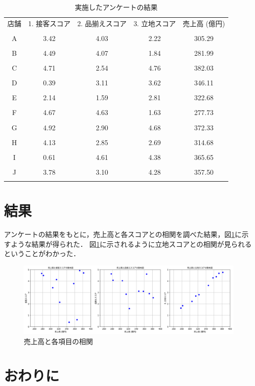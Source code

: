 \documentclass[uplatex]{jsarticle}
\begin{document}
\begin{table}[H]
    \centering
    \caption{実施したアンケートの結果}
    \label{table:anket_result}
    \begin{tabular}{ccccc}
        \hline
        店舗 & 1. 接客スコア & 2. 品揃えスコア & 3. 立地スコア & 売上高 (億円) \\\\ \hline
        A & 3.42 & 4.03 & 2.22 & 305.29 \\\\ \hline
        B & 4.49 & 4.07 & 1.84 & 281.99 \\\\ \hline
        C & 4.71 & 2.54 & 4.76 & 382.03 \\\\ \hline
        D & 0.39 & 3.11 & 3.62 & 346.11 \\\\ \hline
        E & 2.14 & 1.59 & 2.81 & 322.68 \\\\ \hline
        F & 4.67 & 4.63 & 1.63 & 277.73 \\\\ \hline
        G & 4.92 & 2.90 & 4.68 & 372.33 \\\\ \hline
        H & 4.13 & 2.85 & 2.69 & 314.68 \\\\ \hline
        I & 0.61 & 4.61 & 4.38 & 365.65 \\\\ \hline
        J & 3.78 & 3.10 & 4.28 & 357.50 \\\\ \hline
    \end{tabular}
\end{table}

\section{結果}
アンケートの結果をもとに，売上高と各スコアとの相関を調べた結果，図\ref{fig:correlation}に示すような結果が得られた．
図\ref{fig:correlation}に示されるように立地スコアとの相関が見られるということがわかった．


\begin{figure}[H]
    \centering
    \includegraphics[width=1\textwidth]{graph/g.png}
    \caption{売上高と各項目の相関}
    \label{fig:correlation}
\end{figure}


\section{おわりに}
\end{document}
